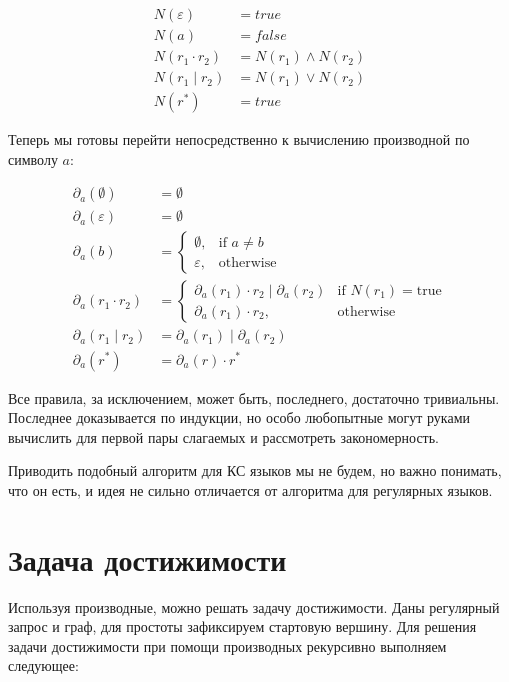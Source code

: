 \begin{align*}
  N(\varepsilon) &= true \\
  N(a) &= false \\ 
  N(r_{1} \cdot r_{2}) &= N(r_{1}) \land N(r_{2}) \\
  N(r_{1} \mid r_{2}) &= N(r_{1}) \lor N(r_{2}) \\
  N(r^*) &= true
\end{align*}

Теперь мы готовы перейти непосредственно к вычислению производной по символу $a$: 

\begin{align*}
  \partial_{a}(\emptyset) &= \emptyset \\
  \partial_{a}(\varepsilon) &= \emptyset \\ 
  \partial_{a}(b) &= \begin{cases} 
  \emptyset, & \mbox{if } a \neq b \\ 
  \varepsilon, & \mbox{otherwise} \end{cases} \\
  \partial_{a}(r_{1} \cdot r_{2}) &= \begin{cases} 
  \partial_{a}(r_{1}) \cdot r_{2} \mid \partial_{a}(r_{2}) & \mbox{if } N(r_{1}) = \mbox{true} \\ 
  \partial_{a}(r_{1}) \cdot r_{2}, & \mbox{otherwise} \end{cases} \\
  \partial_{a}(r_{1} \mid r_{2}) &= \partial_{a}(r_{1}) \mid \partial_{a}(r_{2}) \\
  \partial_{a}(r^*) &= \partial_{a}(r) \cdot r^*
\end{align*}

Все правила, за исключением, может быть, последнего, достаточно тривиальны. Последнее доказывается по индукции, но особо любопытные могут руками вычислить для первой пары слагаемых и рассмотреть закономерность.

Приводить подобный алгоритм для КС языков мы не будем, но важно понимать, что он есть, и идея не сильно отличается от алгоритма для регулярных языков.

\section{Задача достижимости}
Используя производные, можно решать задачу достижимости. Даны регулярный запрос и граф, для простоты зафиксируем стартовую вершину. Для решения задачи достижимости при помощи производных рекурсивно выполняем следующее:

